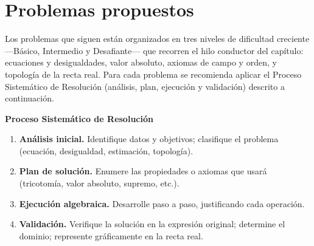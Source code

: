 \section{Problemas propuestos}

Los problemas que siguen están organizados en tres niveles de dificultad
creciente —Básico, Intermedio y Desafiante— que recorren el hilo conductor
del capítulo: ecuaciones y desigualdades, valor absoluto, axiomas de campo y
orden, y topología de la recta real. Para cada problema se recomienda aplicar
el Proceso Sistemático de Resolución (análisis, plan, ejecución y validación)
descrito a continuación.

\textbf{Proceso Sistemático de Resolución}

\begin{enumerate}
   \item \textbf{Análisis inicial.} Identifique datos y objetivos; clasifique
         el problema (ecuación, desigualdad, estimación, topología).
   \item \textbf{Plan de solución.} Enumere las propiedades o axiomas que
         usará (tricotomía, valor absoluto, supremo, etc.).
   \item \textbf{Ejecución algebraica.} Desarrolle paso a paso, justificando
         cada operación.
   \item \textbf{Validación.} Verifique la solución en la expresión original;
         determine el dominio; represente gráficamente en la recta real.
\end{enumerate}


